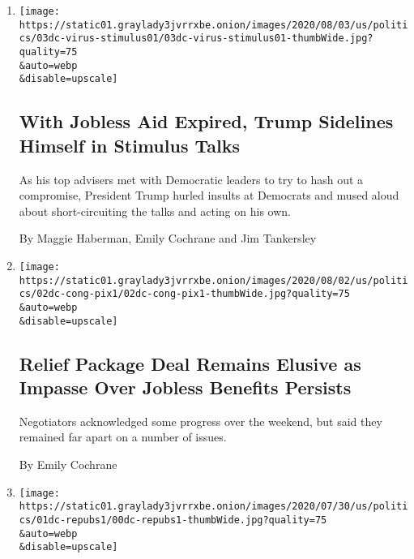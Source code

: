 \begin{enumerate}
\def\labelenumi{\arabic{enumi}.}
\item
  \href{/2020/08/03/us/politics/congress-jobless-aid-talks-trump.html}{}

  \texttt{[image: https://static01.graylady3jvrrxbe.onion/images/2020/08/03/us/politics/03dc-virus-stimulus01/03dc-virus-stimulus01-thumbWide.jpg?quality=75\\\&auto=webp\\\&disable=upscale]}

  \hypertarget{with-jobless-aid-expired-trump-sidelines-himself-in-stimulus-talks}{%
  \subsection{With Jobless Aid Expired, Trump Sidelines Himself in
  Stimulus
  Talks}\label{with-jobless-aid-expired-trump-sidelines-himself-in-stimulus-talks}}

  As his top advisers met with Democratic leaders to try to hash out a
  compromise, President Trump hurled insults at Democrats and mused
  aloud about short-circuiting the talks and acting on his own.

  By Maggie Haberman, Emily Cochrane and Jim Tankersley
\item
  \href{/2020/08/02/us/politics/coronavirus-jobless-aid.html}{}

  \texttt{[image: https://static01.graylady3jvrrxbe.onion/images/2020/08/02/us/politics/02dc-cong-pix1/02dc-cong-pix1-thumbWide.jpg?quality=75\\\&auto=webp\\\&disable=upscale]}

  \hypertarget{relief-package-deal-remains-elusive-as-impasse-over-jobless-benefits-persists}{%
  \subsection{Relief Package Deal Remains Elusive as Impasse Over
  Jobless Benefits
  Persists}\label{relief-package-deal-remains-elusive-as-impasse-over-jobless-benefits-persists}}

  Negotiators acknowledged some progress over the weekend, but said they
  remained far apart on a number of issues.

  By Emily Cochrane
\item
  \href{/2020/08/01/us/politics/trump-suburban-voters-republicans-house.html}{}

  \texttt{[image: https://static01.graylady3jvrrxbe.onion/images/2020/07/30/us/politics/01dc-repubs1/00dc-repubs1-thumbWide.jpg?quality=75\\\&auto=webp\\\&disable=upscale]}


\end{enumerate}
